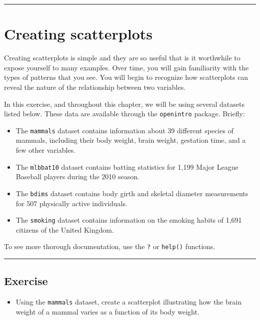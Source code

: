 \documentclass[
]{book}
\providecommand{\tightlist}{%
  \setlength{\itemsep}{0pt}\setlength{\parskip}{0pt}}
\begin{document}
\begin{center}\rule{0.5\linewidth}{0.5pt}\end{center}

\hypertarget{creating-scatterplots}{%
\section{Creating scatterplots}\label{creating-scatterplots}}

Creating scatterplots is simple and they are so useful that is it worthwhile to expose yourself to many examples. Over time, you will gain familiarity with the types of patterns that you see. You will begin to recognize how scatterplots can reveal the nature of the relationship between two variables.

In this exercise, and throughout this chapter, we will be using several datasets listed below. These data are available through the \texttt{openintro} package. Briefly:

\begin{itemize}
\item
  The \texttt{mammals} dataset contains information about 39 different species of mammals, including their body weight, brain weight, gestation time, and a few other variables.
\item
  The \texttt{mlbbat10} dataset contains batting statistics for 1,199 Major League Baseball players during the 2010 season.
\item
  The \texttt{bdims} dataset contains body girth and skeletal diameter measurements for 507 physically active individuals.
\item
  The \texttt{smoking} dataset contains information on the smoking habits of 1,691 citizens of the United Kingdom.
\end{itemize}

To see more thorough documentation, use the \texttt{?} or \texttt{help()} functions.

\begin{center}\rule{0.5\linewidth}{0.5pt}\end{center}

\hypertarget{exercise-2}{%
\subsection*{Exercise}\label{exercise-2}}

\begin{itemize}
\tightlist
\item
  Using the \texttt{mammals} dataset, create a scatterplot illustrating how the brain weight of a mammal varies as a function of its body weight.
\end{itemize}
\end{document}
